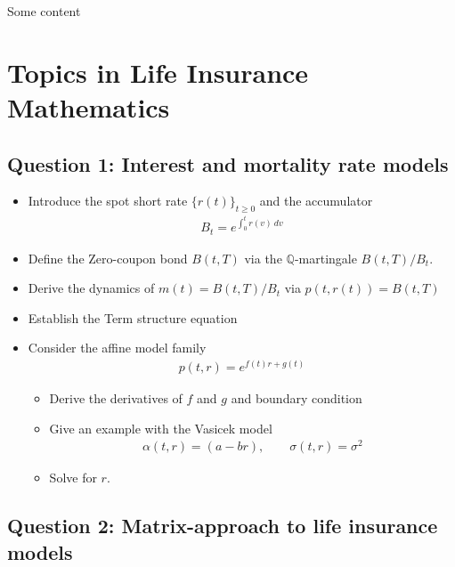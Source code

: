 \documentclass[
]{book}
\providecommand{\tightlist}{%
  \setlength{\itemsep}{0pt}\setlength{\parskip}{0pt}}
\begin{document}
Some content

\hypertarget{topics-in-life-insurance-mathematics}{%
\chapter{Topics in Life Insurance Mathematics}\label{topics-in-life-insurance-mathematics}}

\hypertarget{question-1-interest-and-mortality-rate-models}{%
\section{Question 1: Interest and mortality rate models}\label{question-1-interest-and-mortality-rate-models}}

\begin{itemize}
\tightlist
\item
  Introduce the spot short rate \(\{r(t)\}_{t\ge 0}\) and the accumulator
  \begin{align*}
    B_t=e^{\int_0^tr(v)\ dv}
    \end{align*}
\item
  Define the Zero-coupon bond \(B(t,T)\) via the \(\mathbb Q\)-martingale \(B(t,T)/B_t\).
\item
  Derive the dynamics of \(m(t)=B(t,T)/B_t\) via \(p(t,r(t))=B(t,T)\)
\item
  Establish the Term structure equation
\item
  Consider the affine model family
  \begin{align*}
    p(t,r)=e^{f(t)r+g(t)}
    \end{align*}

  \begin{itemize}
  \tightlist
  \item
    Derive the derivatives of \(f\) and \(g\) and boundary condition
  \item
    Give an example with the Vasicek model
    \begin{align*}
    \alpha(t,r)=(a-br),\qquad \sigma(t,r)=\sigma^2
    \end{align*}
  \item
    Solve for \(r\).
  \end{itemize}
\end{itemize}

\newpage

\hypertarget{question-2-matrix-approach-to-life-insurance-models}{%
\section{Question 2: Matrix-approach to life insurance models}\label{question-2-matrix-approach-to-life-insurance-models}}
\end{document}
